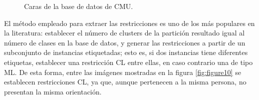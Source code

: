\clearpage

\begin{figure}[bth]
	\myfloatalign
	 \quad
	 \quad
	 \quad
	\caption[Caras de la base de datos de  \ac{CMU}.]{Caras de la base de datos de  \ac{CMU}. \cite{Survey:2007}}\label{fig:figure9}
\end{figure}

El método empleado para extraer las restricciones es uno de los más populares en la literatura: establecer el número de clusters de la partición resultado igual al número de clases en la base de datos, y generar las restricciones a partir de un subconjunto de instancias etiquetadas; esto es, si dos instancias tiene diferentes etiquetas, establecer una restricción \acf{CL} entre ellas, en caso contrario una de tipo \acf{ML}. De esta forma, entre las imágenes mostradas en la figura \ref{fig:figure10} se establecen restricciones \acf{CL}, ya que, aunque pertenecen a la misma persona, no presentan la misma orientación.

